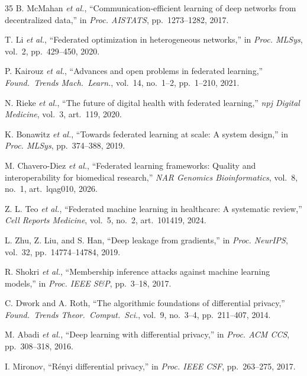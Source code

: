 \documentclass[conference]{IEEEtran}
\begin{document}
\begin{thebibliography}{35}
B. McMahan \textit{et al.}, ``Communication-efficient learning of deep networks from decentralized data,'' in \textit{Proc. AISTATS}, pp.~1273--1282, 2017.

T. Li \textit{et al.}, ``Federated optimization in heterogeneous networks,'' in \textit{Proc. MLSys}, vol.~2, pp.~429--450, 2020.

P. Kairouz \textit{et al.}, ``Advances and open problems in federated learning,'' \textit{Found.~Trends Mach.~Learn.}, vol.~14, no.~1--2, pp.~1--210, 2021.

N. Rieke \textit{et al.}, ``The future of digital health with federated learning,'' \textit{npj Digital Medicine}, vol.~3, art.~119, 2020.

K. Bonawitz \textit{et al.}, ``Towards federated learning at scale: A system design,'' in \textit{Proc. MLSys}, pp.~374--388, 2019.

M. Chavero-Diez \textit{et al.}, ``Federated learning frameworks: Quality and interoperability for biomedical research,'' \textit{NAR Genomics Bioinformatics}, vol.~8, no.~1, art.~lqag010, 2026.

Z. L. Teo \textit{et al.}, ``Federated machine learning in healthcare: A systematic review,'' \textit{Cell Reports Medicine}, vol.~5, no.~2, art.~101419, 2024.

L. Zhu, Z. Liu, and S. Han, ``Deep leakage from gradients,'' in \textit{Proc. NeurIPS}, vol.~32, pp.~14774--14784, 2019.

R. Shokri \textit{et al.}, ``Membership inference attacks against machine learning models,'' in \textit{Proc. IEEE S\&P}, pp.~3--18, 2017.

C. Dwork and A. Roth, ``The algorithmic foundations of differential privacy,'' \textit{Found.~Trends Theor.~Comput.~Sci.}, vol.~9, no.~3--4, pp.~211--407, 2014.

M. Abadi \textit{et al.}, ``Deep learning with differential privacy,'' in \textit{Proc. ACM CCS}, pp.~308--318, 2016.

I. Mironov, ``R\'enyi differential privacy,'' in \textit{Proc. IEEE CSF}, pp.~263--275, 2017.


\end{thebibliography}
\end{document}
